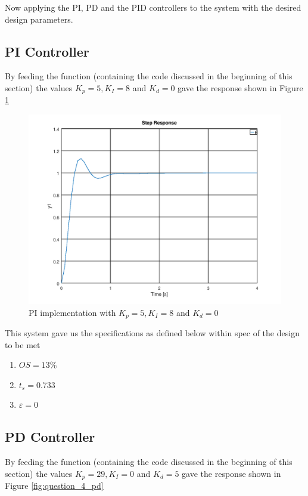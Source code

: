 \documentclass[a4paper, 12pt]{article}
\begin{document}
Now applying the PI, PD and the PID controllers to the system with the desired design parameters.

\subsection{PI Controller} %
\label{sub:pi_controller}
By feeding the function (containing the code discussed in the beginning of this section) the values $K_p = 5, K_I = 8$ and $K_d = 0$ gave the response shown in Figure \ref{fig:question_4_pi}

\begin{figure}[H]
	\centering
	\includegraphics[width=\textwidth]{Images/question_4_PI.png}
	\caption{PI implementation with $K_p = 5, K_I = 8$ and $K_d = 0$}
	\label{fig:question_4_pi}
\end{figure}

This system gave us the specifications as defined below within spec of the design to be met
\begin{enumerate}
	\item $OS = 13\%$
	\item $t_s = 0.733$
	\item $\varepsilon = 0$
\end{enumerate}


\subsection{PD Controller} %
\label{sub:pd_controller}
By feeding the function (containing the code discussed in the beginning of this section) the values $K_p = 29, K_I = 0$ and $K_d = 5$ gave the response shown in Figure \ref{fig:question_4_pd}
\end{document}
